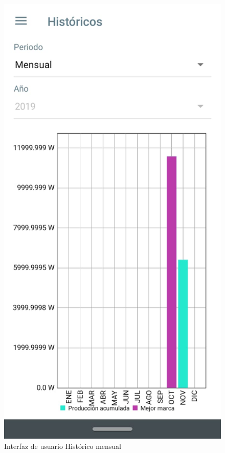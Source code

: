 \begin{figure}[H]
	\centering
	\includegraphics[scale=0.4]{Capitulo4/software/submodulos/images/man28.png}
	\caption{Interfaz de usuario Histórico mensual}
	\label{fig:Historico mensual}
\end{figure}

